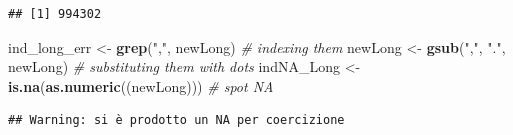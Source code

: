 \documentclass[]{article}
\newenvironment{Shaded}{\begin{snugshade}}{\end{snugshade}}
\newcommand{\KeywordTok}[1]{\textcolor[rgb]{0.13,0.29,0.53}{\textbf{#1}}}
\newcommand{\StringTok}[1]{\textcolor[rgb]{0.31,0.60,0.02}{#1}}
\newcommand{\CommentTok}[1]{\textcolor[rgb]{0.56,0.35,0.01}{\textit{#1}}}
\newcommand{\OperatorTok}[1]{\textcolor[rgb]{0.81,0.36,0.00}{\textbf{#1}}}
\newcommand{\NormalTok}[1]{#1}
\begin{document}
\begin{Shaded}
\end{Shaded}

\begin{verbatim}
## [1] 994302
\end{verbatim}

\begin{Shaded}
\begin{Highlighting}[]
\NormalTok{ind_long_err  <-}\StringTok{ }\KeywordTok{grep}\NormalTok{(}\StringTok{","}\NormalTok{, newLong)             }\CommentTok{# indexing them}
\NormalTok{newLong       <-}\StringTok{ }\KeywordTok{gsub}\NormalTok{(}\StringTok{","}\NormalTok{, }\StringTok{"."}\NormalTok{, newLong)        }\CommentTok{# substituting them with dots}
\NormalTok{indNA_Long    <-}\StringTok{ }\KeywordTok{is.na}\NormalTok{(}\KeywordTok{as.numeric}\NormalTok{((newLong)))   }\CommentTok{# spot NA}
\end{Highlighting}
\end{Shaded}

\begin{verbatim}
## Warning: si è prodotto un NA per coercizione
\end{verbatim}

\begin{Shaded}
\end{Shaded}
\end{document}
